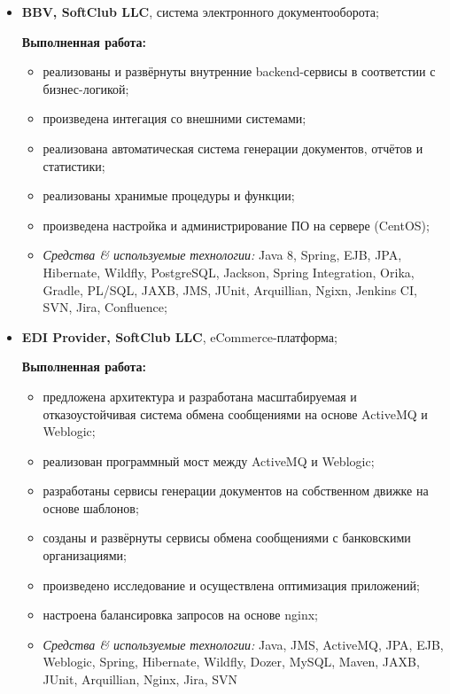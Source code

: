 \documentclass[a4paper, 12pt]{article}
\newcommand{\position}[1]{
    \textbf{#1}}
\newcommand{\itemlabel}[1]{
    \textit{#1:}}
\begin{document}
    \begin{itemize}
        \item \position{BBV, SoftClub LLC}, система электронного документооборота;

            \textbf{Выполненная работа:}
			\begin{itemize}
  				\item реализованы и развёрнуты внутренние backend-сервисы в соответстии с бизнес-логикой;
  				\item произведена интегация со внешними системами;
				\item реализована автоматическая система генерации документов, отчётов и статистики;
  				\item реализованы хранимые процедуры и функции;
  				\item произведена настройка и администрирование ПО на сервере (CentOS);
			\end{itemize}
	
            \begin{itemize}
                \item \itemlabel{Средства \& используемые технологии} Java 8, Spring, EJB, JPA, Hibernate, Wildfly, PostgreSQL, Jackson, Spring Integration, Orika,  Gradle, PL/SQL, JAXB, JMS, JUnit, Arquillian, Ngixn, Jenkins CI, SVN, Jira, Confluence;
            \end{itemize}
    \end{itemize}
    
        \begin{itemize}
        \item \position{EDI Provider, SoftClub LLC}, eCommerce-платформа;

            \textbf{Выполненная работа:}
			\begin{itemize}
  				\item предложена архитектура и разработана масштабируемая и отказоустойчивая система обмена сообщениями на основе ActiveMQ и Weblogic;
  				\item реализован программный мост между ActiveMQ и Weblogic;
  				\item разработаны сервисы генерации документов на собственном движке на основе шаблонов; 
				\item созданы и развёрнуты сервисы обмена сообщениями с банковскими организациями;
  				\item произведено исследование и осуществлена оптимизация приложений;
  				\item настроена балансировка запросов на основе nginx;
			\end{itemize}
	
            \begin{itemize}
                \item \itemlabel{Средства \& используемые технологии} Java, JMS, ActiveMQ, JPA, EJB, Weblogic, Spring, Hibernate, Wildfly, Dozer, MySQL, Maven, JAXB, JUnit, Arquillian, Nginx, Jira, SVN
            \end{itemize}
    \end{itemize}
    
\end{document}
